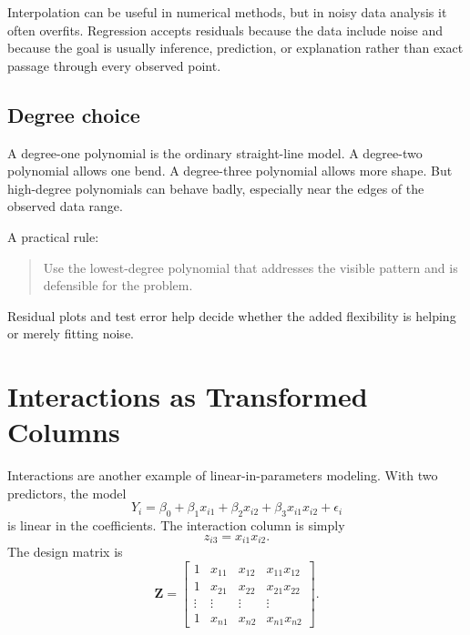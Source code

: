Interpolation can be useful in numerical methods, but in noisy data analysis it often overfits.  Regression accepts residuals because the data include noise and because the goal is usually inference, prediction, or explanation rather than exact passage through every observed point.

\subsection*{Degree choice}

A degree-one polynomial is the ordinary straight-line model.  A degree-two polynomial allows one bend.  A degree-three polynomial allows more shape.  But high-degree polynomials can behave badly, especially near the edges of the observed data range.

A practical rule:
\begin{quote}
  Use the lowest-degree polynomial that addresses the visible pattern and is defensible for the problem.
\end{quote}

Residual plots and test error help decide whether the added flexibility is helping or merely fitting noise.

\section{Interactions as Transformed Columns}

Interactions are another example of linear-in-parameters modeling.  With two predictors, the model
\begin{equation}
  Y_i=\beta_0+\beta_1x_{i1}+\beta_2x_{i2}+\beta_3x_{i1}x_{i2}+\epsilon_i
  \label{eq:ch11-interaction-model}
\end{equation}
is linear in the coefficients.  The interaction column is simply
\begin{equation}
  z_{i3}=x_{i1}x_{i2}.
\end{equation}
The design matrix is
\begin{equation}
  \mathbf{Z}=\begin{bmatrix}
    1 & x_{11} & x_{12} & x_{11}x_{12} \\
    1 & x_{21} & x_{22} & x_{21}x_{22} \\
    \vdots & \vdots & \vdots & \vdots \\
    1 & x_{n1} & x_{n2} & x_{n1}x_{n2}
  \end{bmatrix}.
\end{equation}

